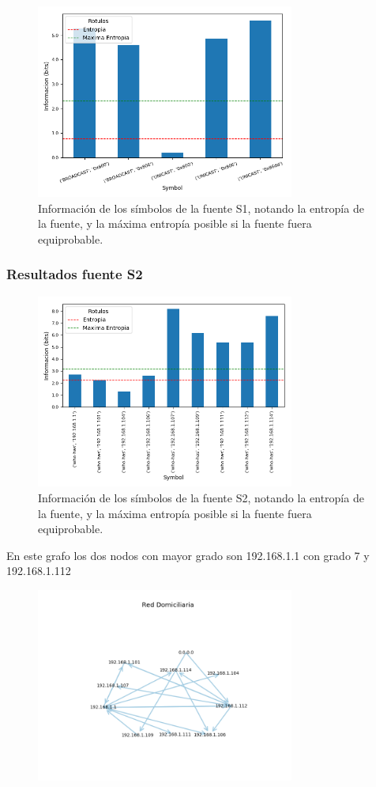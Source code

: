 \begin{figure}[H]
  \centering
  \includegraphics[width=8.5cm]{figs/information_hogar_ethernet_S1_output.png}
  \caption{\normalfont Información de los símbolos de la fuente S1, notando la entropía de la fuente, y la máxima entropía posible si la fuente fuera equiprobable.}
\end{figure}

\subsubsection*{Resultados fuente S2}

\begin{figure}[H]
  \centering
  \includegraphics[width=8.5cm]{figs/information_hogar_ethernet_S2_output.png}
  \caption{\normalfont Información de los símbolos de la fuente S2, notando la entropía de la fuente, y la máxima entropía posible si la fuente fuera equiprobable.}
\end{figure}

En este grafo los dos nodos con mayor grado son 192.168.1.1 con grado 7 y 192.168.1.112

\begin{figure}[H]
 \centering
	\includegraphics[width=8.5cm]{figs/red_domiciliaria.png}
	\caption{}
	\label{fig:starbucks-grafo}
\end{figure}


